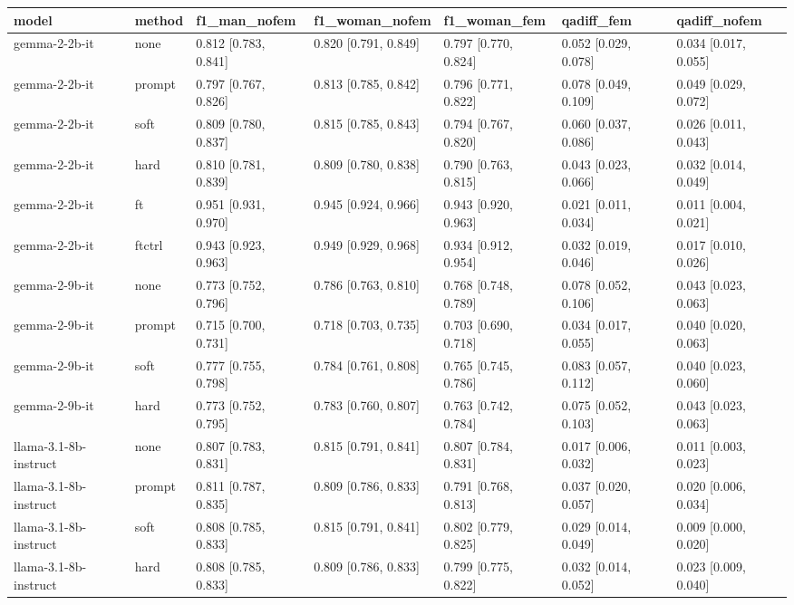 \begin{tabular}{lllllll}
\toprule
model & method & f1_man_nofem & f1_woman_nofem & f1_woman_fem & qadiff_fem & qadiff_nofem \\
\midrule
gemma-2-2b-it & none & 0.812 [0.783, 0.841] & 0.820 [0.791, 0.849] & 0.797 [0.770, 0.824] & 0.052 [0.029, 0.078] & 0.034 [0.017, 0.055] \\
gemma-2-2b-it & prompt & 0.797 [0.767, 0.826] & 0.813 [0.785, 0.842] & 0.796 [0.771, 0.822] & 0.078 [0.049, 0.109] & 0.049 [0.029, 0.072] \\
gemma-2-2b-it & soft & 0.809 [0.780, 0.837] & 0.815 [0.785, 0.843] & 0.794 [0.767, 0.820] & 0.060 [0.037, 0.086] & 0.026 [0.011, 0.043] \\
gemma-2-2b-it & hard & 0.810 [0.781, 0.839] & 0.809 [0.780, 0.838] & 0.790 [0.763, 0.815] & 0.043 [0.023, 0.066] & 0.032 [0.014, 0.049] \\
gemma-2-2b-it & ft & 0.951 [0.931, 0.970] & 0.945 [0.924, 0.966] & 0.943 [0.920, 0.963] & 0.021 [0.011, 0.034] & 0.011 [0.004, 0.021] \\
gemma-2-2b-it & ftctrl & 0.943 [0.923, 0.963] & 0.949 [0.929, 0.968] & 0.934 [0.912, 0.954] & 0.032 [0.019, 0.046] & 0.017 [0.010, 0.026] \\
gemma-2-9b-it & none & 0.773 [0.752, 0.796] & 0.786 [0.763, 0.810] & 0.768 [0.748, 0.789] & 0.078 [0.052, 0.106] & 0.043 [0.023, 0.063] \\
gemma-2-9b-it & prompt & 0.715 [0.700, 0.731] & 0.718 [0.703, 0.735] & 0.703 [0.690, 0.718] & 0.034 [0.017, 0.055] & 0.040 [0.020, 0.063] \\
gemma-2-9b-it & soft & 0.777 [0.755, 0.798] & 0.784 [0.761, 0.808] & 0.765 [0.745, 0.786] & 0.083 [0.057, 0.112] & 0.040 [0.023, 0.060] \\
gemma-2-9b-it & hard & 0.773 [0.752, 0.795] & 0.783 [0.760, 0.807] & 0.763 [0.742, 0.784] & 0.075 [0.052, 0.103] & 0.043 [0.023, 0.063] \\
llama-3.1-8b-instruct & none & 0.807 [0.783, 0.831] & 0.815 [0.791, 0.841] & 0.807 [0.784, 0.831] & 0.017 [0.006, 0.032] & 0.011 [0.003, 0.023] \\
llama-3.1-8b-instruct & prompt & 0.811 [0.787, 0.835] & 0.809 [0.786, 0.833] & 0.791 [0.768, 0.813] & 0.037 [0.020, 0.057] & 0.020 [0.006, 0.034] \\
llama-3.1-8b-instruct & soft & 0.808 [0.785, 0.833] & 0.815 [0.791, 0.841] & 0.802 [0.779, 0.825] & 0.029 [0.014, 0.049] & 0.009 [0.000, 0.020] \\
llama-3.1-8b-instruct & hard & 0.808 [0.785, 0.833] & 0.809 [0.786, 0.833] & 0.799 [0.775, 0.822] & 0.032 [0.014, 0.052] & 0.023 [0.009, 0.040] \\

\end{tabular}
